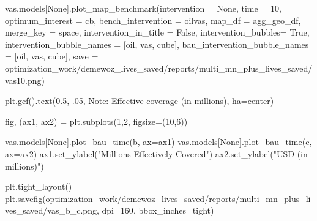 \documentclass[
]{article}
\newenvironment{Shaded}{}{}
\newcommand{\DecValTok}[1]{\textcolor[rgb]{0.25,0.63,0.44}{#1}}
\newcommand{\FloatTok}[1]{\textcolor[rgb]{0.25,0.63,0.44}{#1}}
\newcommand{\NormalTok}[1]{#1}
\newcommand{\OperatorTok}[1]{\textcolor[rgb]{0.40,0.40,0.40}{#1}}
\newcommand{\StringTok}[1]{\textcolor[rgb]{0.25,0.44,0.63}{#1}}
\newcommand{\VariableTok}[1]{\textcolor[rgb]{0.10,0.09,0.49}{#1}}
\begin{document}
\begin{Shaded}
\begin{Highlighting}[numbers=left,,firstnumber=152,]
\NormalTok{vas.models[}\VariableTok{None}\NormalTok{].plot\_map\_benchmark(intervention }\OperatorTok{=} \VariableTok{None}\NormalTok{, }
\NormalTok{time }\OperatorTok{=} \DecValTok{10}\NormalTok{, }
\NormalTok{optimum\_interest }\OperatorTok{=} \StringTok{\textquotesingle{}cb\textquotesingle{}}\NormalTok{, }
\NormalTok{bench\_intervention }\OperatorTok{=} \StringTok{\textquotesingle{}oilvas\textquotesingle{}}\NormalTok{,}
\NormalTok{map\_df }\OperatorTok{=}\NormalTok{ agg\_geo\_df,}
\NormalTok{merge\_key }\OperatorTok{=} \StringTok{\textquotesingle{}space\textquotesingle{}}\NormalTok{,}
\NormalTok{intervention\_in\_title }\OperatorTok{=} \VariableTok{False}\NormalTok{,}
\NormalTok{intervention\_bubbles}\OperatorTok{=} \VariableTok{True}\NormalTok{,}
\NormalTok{intervention\_bubble\_names }\OperatorTok{=}\NormalTok{ [}\StringTok{\textquotesingle{}oil\textquotesingle{}}\NormalTok{, }\StringTok{\textquotesingle{}vas\textquotesingle{}}\NormalTok{, }\StringTok{\textquotesingle{}cube\textquotesingle{}}\NormalTok{],}
\NormalTok{bau\_intervention\_bubble\_names }\OperatorTok{=}\NormalTok{ [}\StringTok{\textquotesingle{}oil\textquotesingle{}}\NormalTok{, }\StringTok{\textquotesingle{}vas\textquotesingle{}}\NormalTok{, }\StringTok{\textquotesingle{}cube\textquotesingle{}}\NormalTok{],}
\NormalTok{save }\OperatorTok{=} \StringTok{\textquotesingle{}optimization\_work/demewoz\_lives\_saved/reports/multi\_mn\_plus\_lives\_saved/vas10.png\textquotesingle{}}\NormalTok{)}

\NormalTok{plt.gcf().text(}\FloatTok{0.5}\NormalTok{,}\OperatorTok{{-}}\FloatTok{.05}\NormalTok{, }\StringTok{\textquotesingle{}Note: Effective coverage (in millions)\textquotesingle{}}\NormalTok{, ha}\OperatorTok{=}\StringTok{\textquotesingle{}center\textquotesingle{}}\NormalTok{)}

\NormalTok{fig, (ax1, ax2)  }\OperatorTok{=}\NormalTok{ plt.subplots(}\DecValTok{1}\NormalTok{,}\DecValTok{2}\NormalTok{, figsize}\OperatorTok{=}\NormalTok{(}\DecValTok{10}\NormalTok{,}\DecValTok{6}\NormalTok{))}

\NormalTok{vas.models[}\VariableTok{None}\NormalTok{].plot\_bau\_time(}\StringTok{\textquotesingle{}b\textquotesingle{}}\NormalTok{, ax}\OperatorTok{=}\NormalTok{ax1)}
\NormalTok{vas.models[}\VariableTok{None}\NormalTok{].plot\_bau\_time(}\StringTok{\textquotesingle{}c\textquotesingle{}}\NormalTok{, ax}\OperatorTok{=}\NormalTok{ax2)}
\NormalTok{ax1.set\_ylabel(}\StringTok{"Millions Effectively Covered"}\NormalTok{)}
\NormalTok{ax2.set\_ylabel(}\StringTok{"USD (in millions)"}\NormalTok{)}

\NormalTok{plt.tight\_layout()}
\NormalTok{plt.savefig(}\StringTok{\textquotesingle{}optimization\_work/demewoz\_lives\_saved/reports/multi\_mn\_plus\_lives\_saved/vas\_b\_c.png\textquotesingle{}}\NormalTok{, dpi}\OperatorTok{=}\DecValTok{160}\NormalTok{, bbox\_inches}\OperatorTok{=}\StringTok{\textquotesingle{}tight\textquotesingle{}}\NormalTok{)}
\end{Highlighting}
\end{Shaded}
\end{document}

